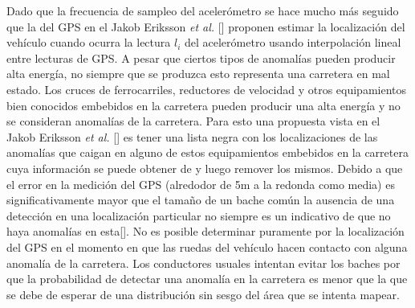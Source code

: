 Dado que la frecuencia de sampleo del acelerómetro se hace mucho más seguido que la del GPS en el Jakob Eriksson {\it et al.} [] proponen estimar la 
localización del vehículo cuando ocurra la lectura $l_i$ del acelerómetro usando interpolación lineal entre lecturas de GPS.
A pesar que ciertos tipos de anomalías pueden producir alta energía, no siempre que se produzca esto representa una carretera en mal estado. Los cruces 
de ferrocarriles, reductores de velocidad y otros equipamientos bien conocidos embebidos en la carretera pueden producir una alta energía y no 
se consideran anomalías de la carretera. Para esto una propuesta vista en el Jakob Eriksson {\it et al.} [] es tener una lista negra con los localizaciones 
de las anomalías que caigan en alguno de estos equipamientos embebidos en la carretera cuya información se puede obtener de  y luego remover los mismos. 
Debido a que el error en la medición del GPS (alredodor de 5m a la redonda como media) es significativamente mayor que el tamaño de un bache común la ausencia 
de una detección en una localización particular no siempre es un indicativo de que no haya anomalías en esta[]. No es posible determinar puramente 
por la localización del GPS en el momento en que las ruedas del vehículo hacen contacto con alguna anomalía de la carretera.  Los conductores usuales 
intentan evitar los baches por que la probabilidad de detectar una anomalía en la carretera es menor que la que se debe de esperar de una distribución  sin 
sesgo del área que se intenta mapear. 


